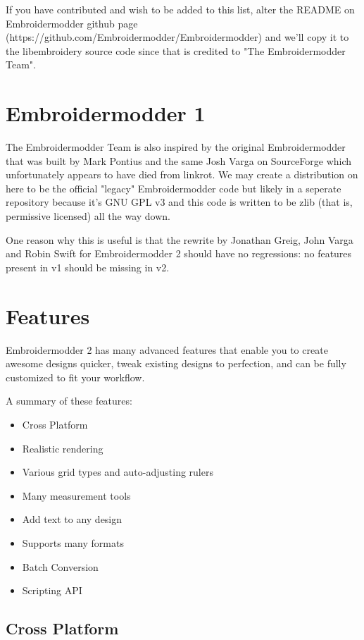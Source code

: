 If you have contributed and wish to be added to this list, alter the  README on Embroidermodder
github page (https://github.com/Embroidermodder/Embroidermodder) and we'll copy it to the
libembroidery source code since that is credited to "The Embroidermodder Team".

\section{Embroidermodder 1}

The Embroidermodder Team is also inspired by the original Embroidermodder that
was built by Mark Pontius and the same Josh Varga on SourceForge which
unfortunately appears to have died from linkrot. We may create a distribution
on here to be the official "legacy" Embroidermodder code but likely in a
seperate repository because it's GNU GPL v3 and this code is written to be
zlib (that is, permissive licensed) all the way down.

One reason why this is useful is that the rewrite by Jonathan Greig, John Varga
and Robin Swift for Embroidermodder 2 should have no regressions: no features
present in v1 should be missing in v2.

\section{Features}

Embroidermodder 2 has many advanced features that enable you to create awesome designs quicker, tweak existing designs to perfection, and can be fully customized to fit your workflow.

A summary of these features:

\begin{itemize}
\item Cross Platform
\item Realistic rendering
\item Various grid types and auto-adjusting rulers
\item Many measurement tools
\item Add text to any design
\item Supports many formats
\item Batch Conversion
\item Scripting API
\end{itemize}

\subsection{Cross Platform}

